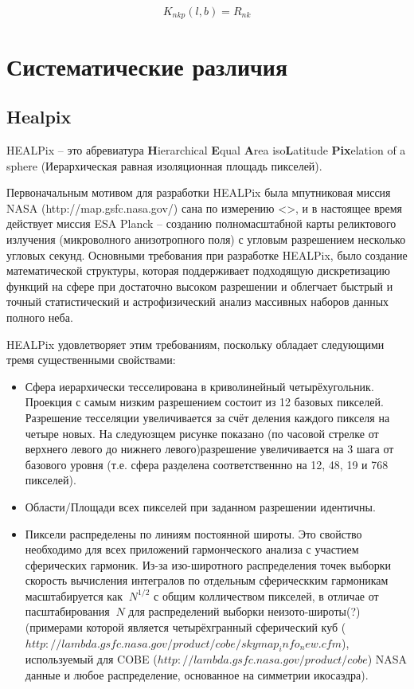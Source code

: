 \documentclass[14pt]{article} %
\begin{document}
$$ K_{nkp}(l,b) = R_{nk} $$


\section{Систематические различия}\label{sistem}
		

\subsection{Healpix}\label{sub:smthhealpix}
HEALPix -- это абревиатура \textbf{H}ierarchical \textbf{E}qual \textbf{A}rea iso\textbf{L}atitude \textbf{Pix}elation of a sphere (Иерархическая равная изоляционная площадь пикселей). 

Первоначальным мотивом для разработки HEALPix была мпутниковая миссия NASA (http://map.gsfc.nasa.gov/) сана по измерению <>, и в настоящее время действует миссия ESA Planck -- созданию полномасштабной карты реликтового излучения (микроволного анизотропного поля) с угловым разрешением несколько угловых секунд. Основными требования при разработке HEALPix, было создание математической структуры, которая поддерживает подходящую дискретизацию функций на сфере при достаточно высоком разрешении и облегчает быстрый и точный статистический и астрофизический анализ массивных наборов данных полного неба.

HEALPix удовлетворяет этим требованиям, поскольку обладает следующими тремя существенными свойствами:

\begin{itemize}
\item Сфера иерархически тесселирована в криволинейный четырёхугольник. Проекция с самым низким разрешением состоит из 12 базовых пикселей. Разрешение тесселяции увеличивается за счёт деления каждого пикселя на четыре новых. На следуюзщем рисунке показано (по часовой стрелке от верхнего левого до нижнего левого)разрешение увеличивается на 3 шага от базового уровня (т.е. сфера разделена соответственнно на 12, 48, 19 и 768 пикселей).
\item Области/Площади всех пикселей при заданном разрешении идентичны.
\item Пиксели распределены по линиям постоянной широты. Это свойство необходимо для всех приложений гармонческого анализа с участием сферических гармоник. Из-за изо-широтного распределения точек выборки скорость вычисления интегралов по отдельным сферическким гармоникам масштабируется как $~N^{1/2}$ с общим колличеством пикселей, в отличае от пасштабирования $~N$ для распределений выборки неизото-широты(?) (примерами которой является четырёхгранный сферический куб ($http://lambda.gsfc.nasa.gov/product/cobe/skymap_info_new.cfm$), используемый для COBE ($http://lambda.gsfc.nasa.gov/product/cobe$) NASA данные и любое распределение, основанное на симметрии икосаэдра).
\end{itemize}
\end{document}

